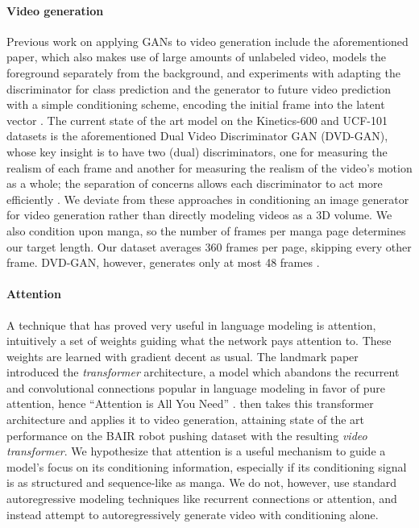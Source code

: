 \documentclass[11pt, oneside]{article}
\begin{document}
\paragraph{Video generation}
Previous work on applying GANs to video generation include the aforementioned
\citeauthor*{scene} paper, which also makes use of large amounts of unlabeled
video, models the foreground separately from the background, and experiments
with adapting the discriminator for class prediction and the generator to
future video prediction with a simple conditioning scheme, encoding the
initial frame into the latent vector \cite{scene}. The current state of the
art model on the Kinetics-600 and UCF-101 datasets is the aforementioned Dual
Video Discriminator GAN (DVD-GAN), whose key insight is to have two (dual)
discriminators, one for measuring the realism of each frame and another for
measuring the realism of the video's motion as a whole; the separation of
concerns allows each discriminator to act more efficiently \cite{dvdgan}. We
deviate from these approaches in conditioning an image generator for video
generation rather than directly modeling videos as a 3D volume.
We also condition upon manga, so the number of frames per manga page determines
our target length. Our dataset averages 360 frames per page, skipping every
other frame. DVD-GAN, however, generates only at most 48 frames \cite{dvdgan}.

\paragraph{Attention}
A technique that has proved very useful in language modeling is attention,
intuitively a set of weights guiding what the network pays attention to.
These weights are learned with gradient decent as usual. The landmark paper
 introduced the \emph{transformer} architecture, a model
which abandons the recurrent and convolutional connections popular in language
modeling in favor of pure attention, hence \enquote{Attention is All You Need}
\cite{attention}. \cite{transformer} then takes this transformer architecture
and applies it to video generation, attaining state of the art performance on
the BAIR robot pushing dataset with the resulting \emph{video transformer}.
We hypothesize that attention is a useful mechanism to guide a model's focus
on its conditioning information, especially if its conditioning signal is
as structured and sequence-like as manga. We do not, however, use standard
autoregressive modeling techniques like recurrent connections or attention, and
instead attempt to autoregressively generate video with conditioning alone.
\end{document}

